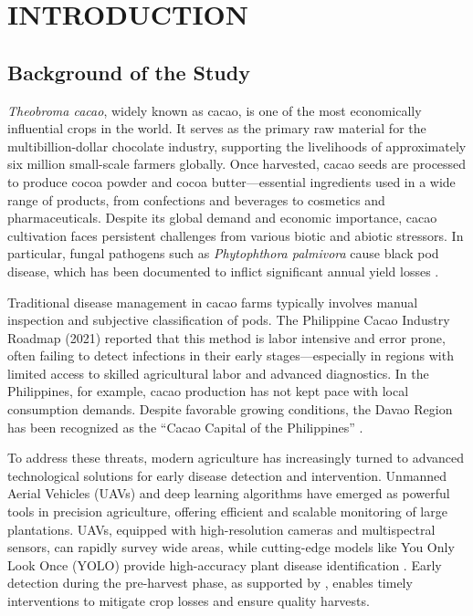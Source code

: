 \chapter{INTRODUCTION}

{\baselineskip

\section{Background of the Study}

\textit{Theobroma cacao}, widely known as cacao, is one of the most economically influential crops in the world. It serves as the primary raw material for the multibillion-dollar chocolate industry, supporting the livelihoods of approximately six million small-scale farmers globally. Once harvested, cacao seeds are processed to produce cocoa powder and cocoa butter—essential ingredients used in a wide range of products, from confections and beverages to cosmetics and pharmaceuticals. Despite its global demand and economic importance, cacao cultivation faces persistent challenges from various biotic and abiotic stressors. In particular, fungal pathogens such as \textit{Phytophthora palmivora} cause black pod disease, which has been documented to inflict significant annual yield losses \cite{Avila2023}.

Traditional disease management in cacao farms typically involves manual inspection and subjective classification of pods. The Philippine Cacao Industry Roadmap (2021) reported that this method is labor intensive and error prone, often failing to detect infections in their early stages—especially in regions with limited access to skilled agricultural labor and advanced diagnostics. In the Philippines, for example, cacao production has not kept pace with local consumption demands. Despite favorable growing conditions, the Davao Region has been recognized as the ``Cacao Capital of the Philippines'' \cite{PCAF2021}.

To address these threats, modern agriculture has increasingly turned to advanced technological solutions for early disease detection and intervention. Unmanned Aerial Vehicles (UAVs) and deep learning algorithms have emerged as powerful tools in precision agriculture, offering efficient and scalable monitoring of large plantations. UAVs, equipped with high-resolution cameras and multispectral sensors, can rapidly survey wide areas, while cutting-edge models like You Only Look Once (YOLO) provide high-accuracy plant disease identification \cite{Vyas2023}. Early detection during the pre-harvest phase, as supported by \cite{Upadhyay2025,Yadav2024}, enables timely interventions to mitigate crop losses and ensure quality harvests.

}
